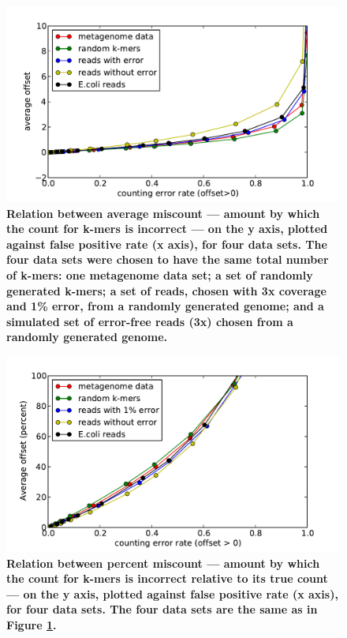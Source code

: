 \documentclass[10pt]{article}
\begin{document}
\begin{figure}[!ht]
\centerline{\includegraphics[width=5in]{./figure/average_offset_vs_fpr}}
\caption{\bf Relation between average miscount --- amount by which
the count for k-mers is incorrect --- on the y axis, plotted against
false positive rate (x axis), for four data sets.  The four data
sets were chosen to have the same total number of k-mers: one
metagenome data set; a set of randomly generated k-mers; a set
of reads, chosen with 3x coverage and 1\% error, from a randomly generated
genome; and a simulated set of error-free reads (3x) chosen from a randomly
generated genome.}
\label{fig:average_offset_vs_fpr}
\end{figure}

\begin{figure}[!ht]
\centerline{\includegraphics[width=5in]{./figure/percent_offset_vs_fpr}}
\caption{\bf Relation between percent miscount --- amount by which the
  count for k-mers is incorrect relative to its true count --- on the
  y axis, plotted against false positive rate (x axis), for four data
  sets.  The four data sets are the same as in Figure
  \ref{fig:average_offset_vs_fpr}.}
\label{fig:percent_offset_vs_fpr}
\end{figure}
\end{document}
